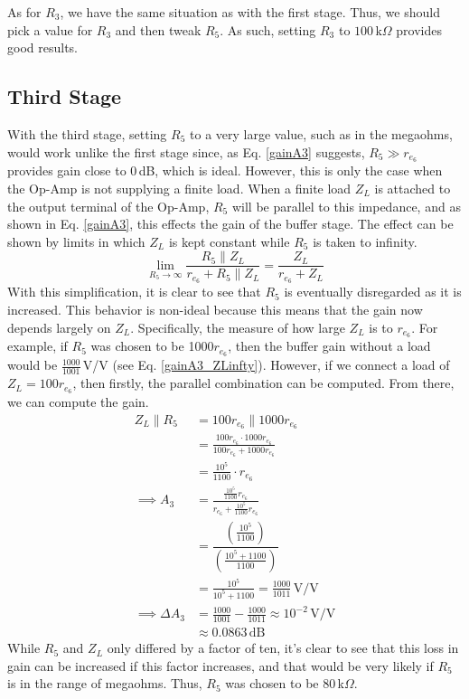 \documentclass[lettersize,journal]{IEEEtran}
\begin{document}
As for $R_3$, we have the same situation as with the first stage. Thus, 
we should pick a value for $R_3$ and then tweak $R_5$. As such, 
setting $R_3$ to $100\,\text{k}\Omega$ provides good results.

\subsection{Third Stage}
With the third stage, setting $R_5$ to a very large value, such as in the 
megaohms, would work unlike the first stage since, as Eq. \eqref{gainA3}
suggests, $R_5 \gg r_{e_6}$ provides gain close to 0$\,$dB, which is ideal.
However, this is only the case 
when the Op-Amp is not supplying a finite load. When a finite load $Z_L$ is attached 
to the output terminal of the Op-Amp, $R_5$ will be parallel to this impedance, 
and as shown in Eq. \eqref{gainA3}, this effects the gain of the buffer stage.
The effect can be shown by limits in which $Z_L$ is kept constant while $R_5$ is taken to 
infinity.
\begin{equation}
  \lim_{R_5 \rightarrow \infty} \frac{R_5 \parallel Z_L}{r_{e_6} + R_5\parallel Z_L} = \frac{Z_L}{r_{e_6} + Z_L}
\end{equation}
With this simplification, it is clear to see that $R_5$ is eventually disregarded 
as it is increased. This behavior is non-ideal because this means that the gain 
now depends largely on $Z_L$. Specifically, the measure of how large $Z_L$ is to 
$r_{e_6}$. For example, if $R_5$ was chosen to be 1000$r_{e_6}$, then the buffer gain 
without a load would be $\frac{1000}{1001}\,$V/V (see Eq. \eqref{gainA3_ZLinfty}).
However, if we connect a load of $Z_L = 100r_{e_6}$, then firstly, the 
parallel combination can be computed. From there, we can compute the gain.
\begin{align}
  Z_L \parallel R_5 &= 100r_{e_6} \parallel 1000r_{e_6} \\[1ex]
                    &= \frac{100r_{e_6} \cdot 1000r_{e_6}}{100r_{e_6} + 1000r_{e_6}} \\[1ex]
                    &= \frac{10^5}{1100}\cdot r_{e_6} \\[1ex]
       \implies A_3 &= \frac{\frac{10^5}{1100}r_{e_6}}{r_{e_6} + \frac{10^5}{1100}r_{e_6}} \\[1ex]
                    &= \dfrac{\left(\frac{10^5}{1100}\right)}{\left(\frac{10^5 + 1100}{1100}\right)} \\[1ex]
                    &= \frac{10^5}{10^5 + 1100} = \frac{1000}{1011} \,\text{V/V} \\[1ex]
\implies \Delta A_3 &= \frac{1000}{1001} - \frac{1000}{1011} \approx 10^{-2} \,\text{V/V} \\[1ex]
                    &\approx 0.0863 \,\text{dB}
\end{align}
While $R_5$ and $Z_L$ only differed by a factor of ten, it's clear to see that this loss in 
gain can be increased if this factor increases, and that would be very likely if 
$R_5$ is in the range of megaohms. Thus, $R_5$ was chosen to be 80$\,$k$\Omega$.
\end{document}
